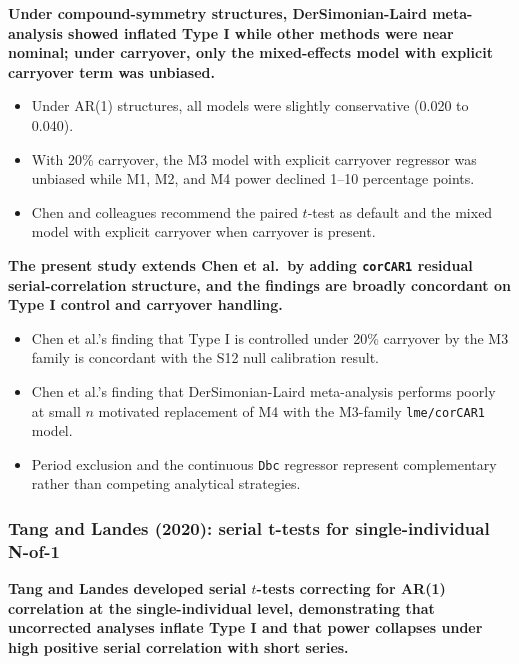 \documentclass[
  11pt,
]{article}
\begin{document}
\textbf{Under compound-symmetry structures, DerSimonian-Laird meta-analysis showed inflated Type I while other methods were near nominal; under carryover, only the mixed-effects model with explicit carryover term was unbiased.}

\begin{itemize}\setlength{\itemsep}{2pt}\setlength{\parskip}{0pt}
\item Under AR(1) structures, all models were slightly conservative (0.020 to 0.040).
\item With 20\% carryover, the M3 model with explicit carryover regressor was unbiased while M1, M2, and M4 power declined 1--10 percentage points.
\item Chen and colleagues recommend the paired $t$-test as default and the mixed model with explicit carryover when carryover is present.
\end{itemize}

\textbf{The present study extends Chen et al.\ by adding \texttt{corCAR1} residual serial-correlation structure, and the findings are broadly concordant on Type I control and carryover handling.}

\begin{itemize}\setlength{\itemsep}{2pt}\setlength{\parskip}{0pt}
\item Chen et al.'s finding that Type I is controlled under 20\% carryover by the M3 family is concordant with the S12 null calibration result.
\item Chen et al.'s finding that DerSimonian-Laird meta-analysis performs poorly at small $n$ motivated replacement of M4 with the M3-family \texttt{lme/corCAR1} model.
\item Period exclusion and the continuous \texttt{Dbc} regressor represent complementary rather than competing analytical strategies.
\end{itemize}

\subsubsection{Tang and Landes (2020): serial t-tests for single-individual N-of-1}\label{tang-and-landes-2020-serial-t-tests-for-single-individual-n-of-1}

\textbf{Tang and Landes developed serial $t$-tests correcting for AR(1) correlation at the single-individual level, demonstrating that uncorrected analyses inflate Type I and that power collapses under high positive serial correlation with short series.}
\end{document}
